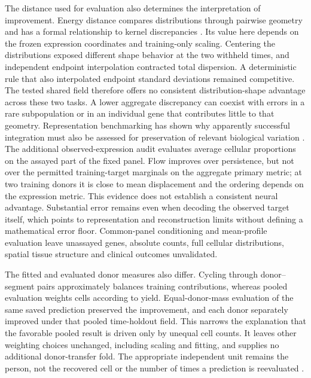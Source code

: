 The distance used for evaluation also determines the interpretation of improvement. Energy distance compares distributions through pairwise geometry and has a formal relationship to kernel discrepancies \citep{szekely2013,sejdinovic2013}. Its value here depends on the frozen expression coordinates and training-only scaling. Centering the distributions exposed different shape behavior at the two withheld times, and independent endpoint interpolation contracted total dispersion. A deterministic rule that also interpolated endpoint standard deviations remained competitive. The tested shared field therefore offers no consistent distribution-shape advantage across these two tasks. A lower aggregate discrepancy can coexist with errors in a rare subpopulation or in an individual gene that contributes little to that geometry. Representation benchmarking has shown why apparently successful integration must also be assessed for preservation of relevant biological variation \citep{luecken2022}. The additional observed-expression audit evaluates average cellular proportions on the assayed part of the fixed panel. Flow improves over persistence, but not over the permitted training-target marginals on the aggregate primary metric; at two training donors it is close to mean displacement and the ordering depends on the expression metric. This evidence does not establish a consistent neural advantage. Substantial error remains even when decoding the observed target itself, which points to representation and reconstruction limits without defining a mathematical error floor. Common-panel conditioning and mean-profile evaluation leave unassayed genes, absolute counts, full cellular distributions, spatial tissue structure and clinical outcomes unvalidated.

The fitted and evaluated donor measures also differ. Cycling through donor--segment pairs approximately balances training contributions, whereas pooled evaluation weights cells according to yield. Equal-donor-mass evaluation of the same saved prediction preserved the improvement, and each donor separately improved under that pooled time-holdout field. This narrows the explanation that the favorable pooled result is driven only by unequal cell counts. It leaves other weighting choices unchanged, including scaling and fitting, and supplies no additional donor-transfer fold. The appropriate independent unit remains the person, not the recovered cell or the number of times a prediction is reevaluated \citep{zimmerman2021}.

